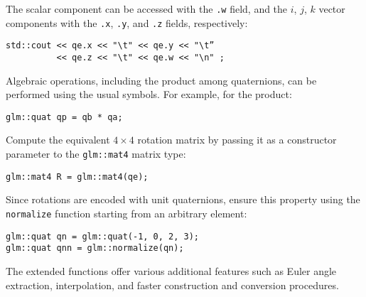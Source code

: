 The scalar component can be accessed with the \texttt{.w} field, and the $i$, $j$, $k$ vector components with the \texttt{.x}, \texttt{.y}, and \texttt{.z} fields, respectively:
\begin{verbatim}
std::cout << qe.x << "\t" << qe.y << "\t”
          << qe.z << "\t" << qe.w << "\n" ;
\end{verbatim}
Algebraic operations, including the product among quaternions, can be performed using the usual symbols. 
For example, for the product:
\begin{verbatim}
glm::quat qp = qb * qa;
\end{verbatim}
Compute the equivalent $4\times4$ rotation matrix by passing it as a constructor parameter to the \texttt{glm::mat4} matrix type: 
\begin{verbatim}
glm::mat4 R = glm::mat4(qe);
\end{verbatim}
Since rotations are encoded with unit quaternions, ensure this property using the \texttt{normalize}  function starting from an arbitrary element:
\begin{verbatim}
glm::quat qn = glm::quat(-1, 0, 2, 3);
glm::quat qnn = glm::normalize(qn);
\end{verbatim}
The extended functions offer various additional features such as Euler angle extraction, interpolation, and faster construction and conversion procedures.